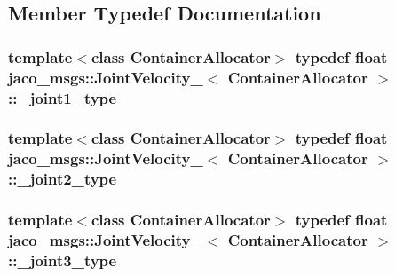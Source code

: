 \subsection{Member Typedef Documentation}
\subsubsection[{\texorpdfstring{\+\_\+joint1\+\_\+type}{_joint1_type}}]{\setlength{\rightskip}{0pt plus 5cm}template$<$class Container\+Allocator$>$ typedef float {\bf jaco\+\_\+msgs\+::\+Joint\+Velocity\+\_\+}$<$ Container\+Allocator $>$\+::{\bf \+\_\+joint1\+\_\+type}}\hypertarget{structjaco__msgs_1_1JointVelocity___ab6a0b6d8bf7015aff3a61c25b4bdf67b}{}\label{structjaco__msgs_1_1JointVelocity___ab6a0b6d8bf7015aff3a61c25b4bdf67b}
\subsubsection[{\texorpdfstring{\+\_\+joint2\+\_\+type}{_joint2_type}}]{\setlength{\rightskip}{0pt plus 5cm}template$<$class Container\+Allocator$>$ typedef float {\bf jaco\+\_\+msgs\+::\+Joint\+Velocity\+\_\+}$<$ Container\+Allocator $>$\+::{\bf \+\_\+joint2\+\_\+type}}\hypertarget{structjaco__msgs_1_1JointVelocity___a60a2a12b126edac2c3004568aa77f833}{}\label{structjaco__msgs_1_1JointVelocity___a60a2a12b126edac2c3004568aa77f833}
\subsubsection[{\texorpdfstring{\+\_\+joint3\+\_\+type}{_joint3_type}}]{\setlength{\rightskip}{0pt plus 5cm}template$<$class Container\+Allocator$>$ typedef float {\bf jaco\+\_\+msgs\+::\+Joint\+Velocity\+\_\+}$<$ Container\+Allocator $>$\+::{\bf \+\_\+joint3\+\_\+type}}\hypertarget{structjaco__msgs_1_1JointVelocity___a516b16873309e426015d059948c9de5f}{}\label{structjaco__msgs_1_1JointVelocity___a516b16873309e426015d059948c9de5f}
